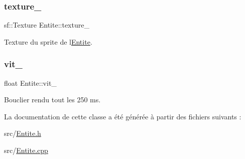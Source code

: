 \subsubsection{\texorpdfstring{texture\+\_\+}{texture\_}}
{\footnotesize\ttfamily sf\+::\+Texture Entite\+::texture\+\_\+\hspace{0.3cm}{\ttfamily [protected]}}



Texture du sprite de l\textquotesingle{}\hyperlink{class_entite}{Entite}. 

\mbox{\label{class_entite_aaacb36948d7853e03a7f9a42aa6ad2d5}} 
\subsubsection{\texorpdfstring{vit\+\_\+}{vit\_}}
{\footnotesize\ttfamily float Entite\+::vit\+\_\+\hspace{0.3cm}{\ttfamily [protected]}}



Bouclier rendu tout les 250 ms. 



La documentation de cette classe a été générée à partir des fichiers suivants \+:\begin{DoxyCompactItemize}
\item 
src/\hyperlink{_entite_8h}{Entite.\+h}\item 
src/\hyperlink{_entite_8cpp}{Entite.\+cpp}\end{DoxyCompactItemize}
